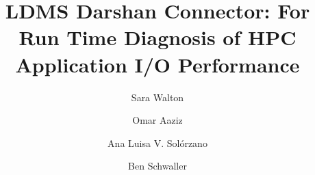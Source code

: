 \documentclass[conference]{IEEEtran}
\begin{document}
\title{LDMS Darshan Connector: For Run Time Diagnosis of HPC Application I/O Performance}


\author[1]{Sara Walton}
\author[1]{Omar Aaziz}
\author[2]{Ana Luisa V. Solórzano}
\author[1]{Ben Schwaller}

\maketitle














\end{document}

